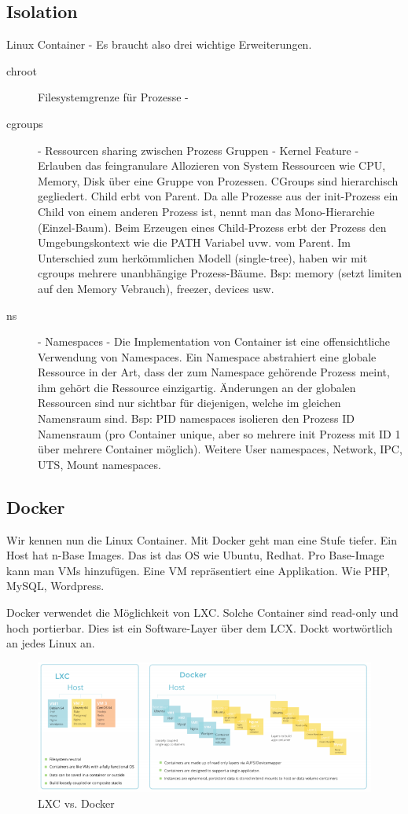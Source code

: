 \subsection{Isolation}
Linux Container - Es braucht also drei wichtige Erweiterungen.
\begin{description}
	\item[chroot] Filesystemgrenze für Prozesse -
	\item[cgroups]  - Ressourcen sharing zwischen Prozess Gruppen - Kernel Feature - Erlauben das feingranulare Allozieren von System Ressourcen wie CPU, Memory, Disk über eine Gruppe von Prozessen. CGroups sind hierarchisch gegliedert. Child erbt von Parent. Da alle Prozesse aus der init-Prozess ein Child von einem anderen Prozess ist, nennt man das Mono-Hierarchie (Einzel-Baum).  Beim Erzeugen eines Child-Prozess erbt der Prozess den Umgebungskontext wie die PATH Variabel uvw. vom Parent. Im Unterschied zum herkömmlichen Modell (single-tree), haben wir mit cgroups mehrere unanbhängige Prozess-Bäume. Bsp: memory (setzt limiten auf den Memory Vebrauch), freezer, devices usw.
	\item[ns] - Namespaces - Die Implementation von Container ist eine offensichtliche Verwendung von Namespaces. Ein Namespace abstrahiert eine globale Ressource in der Art, dass der zum Namespace gehörende Prozess meint, ihm gehört die Ressource einzigartig. Änderungen an der globalen Ressourcen sind nur sichtbar für diejenigen, welche im gleichen Namensraum sind. Bsp: PID namespaces isolieren den Prozess ID Namensraum (pro Container unique, aber so mehrere init Prozess mit ID 1 über mehrere Container möglich). Weitere User namespaces, Network, IPC, UTS, Mount namespaces.
\end{description} 

\subsection{Docker}
Wir kennen nun die Linux Container. Mit Docker geht man eine Stufe tiefer. Ein Host hat n-Base Images. Das ist das OS wie Ubuntu, Redhat. Pro Base-Image kann man VMs hinzufügen. Eine VM repräsentiert eine Applikation. Wie PHP, MySQL, Wordpress.

Docker verwendet die Möglichkeit von LXC. Solche Container sind read-only und hoch portierbar. Dies ist ein Software-Layer über dem LCX. Dockt wortwörtlich an jedes Linux an.

\begin{figure}[h!]
\centering
\includegraphics[width=0.9\linewidth]{fig/lxc-vs-docker}
\caption{LXC vs. Docker}
\label{fig:lxc-vs-docker}
\end{figure}